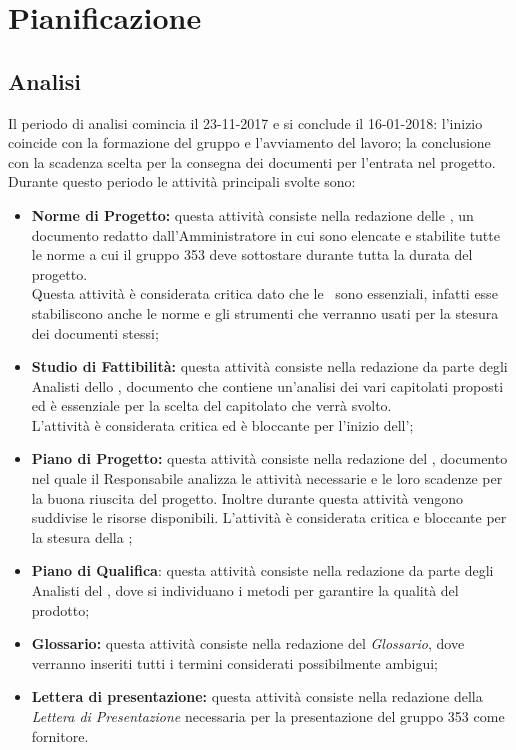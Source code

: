 \documentclass[PianoDiProgetto.tex]{subfiles}
\begin{document}
\chapter{Pianificazione}

\section{Analisi}
Il periodo di analisi comincia il 23-11-2017 e si conclude il 16-01-2018: l'inizio coincide con la formazione del gruppo e l'avviamento del lavoro; la conclusione con la scadenza scelta per la consegna dei documenti per l'entrata nel progetto. Durante questo periodo le attività principali svolte sono:
\begin{itemize}
	\item \textbf{Norme di Progetto:} questa attività consiste nella redazione delle \normediprogetto, un documento redatto dall'Amministratore in cui sono elencate e stabilite tutte le norme a cui il gruppo 353 deve sottostare durante tutta la durata del progetto.\\ 
	Questa attività è considerata critica dato che le \normediprogetto\ sono essenziali, infatti esse stabiliscono anche le norme e gli strumenti che verranno usati per la stesura dei documenti stessi;
	\item \textbf{Studio di Fattibilità:} questa attività consiste nella redazione da parte degli Analisti dello \studiodifattibilita, documento che contiene un'analisi dei vari capitolati proposti ed è essenziale per la scelta del capitolato che verrà svolto. \\
	L'attività è considerata critica ed è bloccante per l'inizio dell'\analisideirequisiti;
	\item \textbf{Piano di Progetto:} questa attività consiste nella redazione del \pianodiprogetto, documento nel quale il Responsabile analizza le attività necessarie e le loro scadenze per la buona riuscita del progetto. Inoltre durante questa attività vengono suddivise le risorse disponibili. L'attività è considerata critica e bloccante per la stesura della ;
	\item \textbf{Piano di Qualifica}: questa attività consiste nella redazione da parte degli Analisti del \pianodiqualifica, dove si individuano i metodi per garantire la qualità del prodotto;
	\item \textbf{Glossario:} questa attività consiste nella redazione del \textit{Glossario}, dove verranno inseriti tutti i termini considerati possibilmente ambigui;
	\item \textbf{Lettera di presentazione:} questa attività consiste nella redazione della \textit{Lettera di Presentazione} necessaria per la presentazione del gruppo 353 come fornitore. 	
\end{itemize}	
\end{document}
